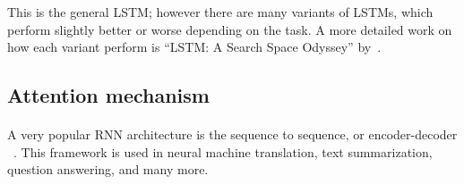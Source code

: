 
This is the general LSTM; however there are many variants of LSTMs, which perform slightly better or worse depending on the task. A more detailed work on how each variant perform is ``LSTM: A Search Space Odyssey'' by~\citet{greff2017lstm}.


\subsection{Attention mechanism}



\paragraph{}
A very popular RNN architecture is the sequence to sequence, or encoder-decoder ~\citep{cho-etal-2014-learning,sutskever2014sequence}. This framework is used in neural machine translation, text summarization, question answering, and many more. 

